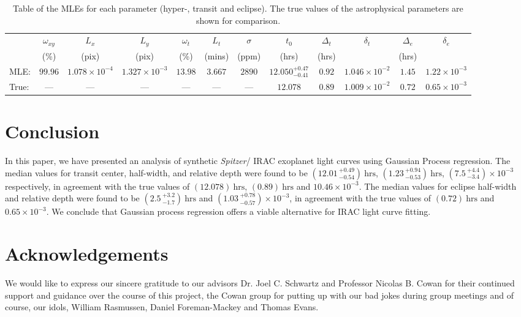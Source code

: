 \documentclass[twocolumn]{aastex61}
\begin{document}
\begin{table}[p]
\centering
\caption{Table of the MLEs for each parameter (hyper-, transit and eclipse). The true values of the astrophysical parameters are shown for comparison.}
\label{tbl:MLE}
\begin{tabular}{lccccccccccc}
      & $\omega_{xy}$ & $L_{x}$                & $L_{y}$                & $\omega_{t}$ & $L_{t}$ & $\sigma$ & $t_{0}$  & $\Delta_{t}$ & $\delta_{t}$ & $\Delta_{e}$ & $\delta_{e}$ \\
      & (\%)          & (pix)                  & (pix)                  & (\%)         & (mins)  & (ppm)    & (hrs)    & (hrs)        &     & (hrs)        &     \\ \cline{2-12}
MLE:  & $99.96$       & $1.078 \times 10^{-4}$ & $1.327 \times 10^{-3}$ & $13.98$      & $3.667$ & $2890$   & $12.050^{+0.47}_{-0.41}$ & $0.92$       & $1.046\times 10^{-2}$    & $1.45$       & $1.22 \times 10^{-3}$    \\
True: & ---           & ---                    & ---                    & ---          & ---     & ---      & $12.078$ & $0.89$       & $1.009\times 10^{-2}$    & $0.72$       & $0.65\times 10^{-3}$
\end{tabular}
\end{table}

\section{Conclusion}
\label{sec:conclusion}
In this paper, we have presented an analysis of synthetic \textit{Spitzer}/ IRAC exoplanet light curves using Gaussian Process regression. The median values for transit center, half-width, and relative depth were found to be $(12.01\,^{+0.49}_{-0.54})\ \mathrm{hrs}$, $(1.23\,^{+0.94}_{-0.53})\ \mathrm{hrs}$, $(7.5\,^{+4.4}_{-3.4})\times 10^{-3}$ respectively, in agreement with the true values of $(12.078)\ \mathrm{hrs}$, $(0.89)\ \mathrm{hrs}$ and $10.46\times 10^{-3}$. The median values for eclipse half-width and relative depth were found to be $(2.5\,^{+3.2}_{-1.7})\ \mathrm{hrs}$ and $(1.03\,^{+0.78}_{-0.57})\times 10^{-3}$, in agreement with the true values of $(0.72)\ \mathrm{hrs}$ and $0.65\times 10^{-3}$. We conclude that Gaussian process regression offers a viable alternative for IRAC light curve fitting.
\pagebreak
\section{Acknowledgements}
We would like to express our sincere gratitude to our advisors Dr. Joel C. Schwartz and Professor Nicolas B. Cowan for their continued support and guidance over the course of this project, the Cowan group for putting up with our bad jokes during group meetings and of course, our idols, William Rasmussen, Daniel Foreman-Mackey and Thomas Evans.
\end{document}

